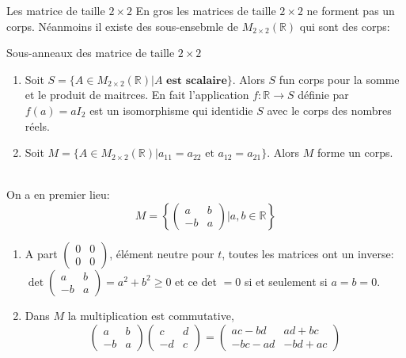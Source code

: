 \begin{parag}{Les matrice de taille $2 \times 2$}
    En gros les matrices de taille $2 \times 2$ ne forment pas un corps. Néanmoins il existe des sous-ensebmle de $M_{2\times 2}(\mathbb{R})$ qui sont des corps:
    
\end{parag}
\begin{parag}{Sous-anneaux des matrice de taille $2 \times 2$}
    \begin{enumerate}
        \item Soit $S = \{A \in M_{2\times 2}(\mathbb{R})| A \textbf{ est scalaire}\}$. Alors $S$ fun corps pour la somme et le produit de maitrces. En fait l'application $f: \mathbb{R} \to S$ définie par $f(a) = aI_2$ est un isomorphisme qui identidie $S$ avec le corps des nombres réels.
        \item Soit $M = \{A \in M_{2\times 2}(\mathbb{R})| a_{11} = a_{22} \text{ et } a_{12} = a_{21}\}$. Alors $M$ forme un corps.
    \end{enumerate}
    \\
    On a en premier lieu:
    \[M = \left\{\begin{pmatrix}
        a & b \\ -b & a
    \end{pmatrix}| a, b \in \mathbb{R}\right\}\]
    \begin{enumerate}
        \item A part $\begin{pmatrix}
            0 & 0 \\ 0 & 0
        \end{pmatrix}$, élément neutre pour $t$, toutes les matrices ont un inverse: $\det \begin{pmatrix}
            a & b\\ -b & a
        \end{pmatrix} = a^2 + b^2 \geq 0$ et ce det $= 0$ si et seulement si $a = b = 0$.
        \item Dans $M$ la multiplication est commutative, 
        \[\begin{pmatrix}
            a & b \\ -b & a
        \end{pmatrix}\begin{pmatrix}
            c & d \\ -d & c
        \end{pmatrix} = \begin{pmatrix}
            ac - bd & ad + bc \\ -bc- ad & -bd + ac

\end{pmatrix}\]
\end{enumerate}
\end{parag}
